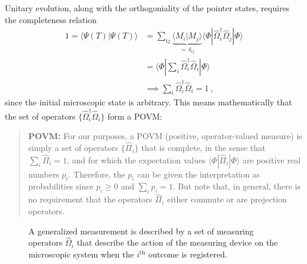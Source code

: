 \documentclass[12pt]{article}
\theoremstyle{plain}
\theoremstyle{definition}
\theoremstyle{remark}
\def\bra#1{\langle #1|}
\def\ket#1{| #1\rangle}
\begin{document}
Unitary evolution, along with the orthogoniality of the pointer states, requires the completeness relation
\begin{align}
1=\bra{\Psi(T)}\Psi(T)\rangle
&=\sum_{ij}\underbrace{\bra{M_i}M_j\rangle}_{=\,\delta_{ij}}\bra{\Phi}\hat \Omega_i^\dagger\hat \Omega_j\ket{\Phi}\\
&=\bra{\Phi}\sum_i\hat \Omega_i^\dagger\hat \Omega_i\ket{\Phi}\\
&\!\!\implies\sum_i\hat\Omega_i^\dagger\hat\Omega_i=1\ ,
\label{com}
\end{align}
since the initial microscopic state is arbitrary.
This means mathematically that the set of operators $\{\hat\Omega_i^\dagger\hat\Omega_i\}$ form a POVM: 
\begin{quote}{\bf POVM:} For our purposes, a POVM (positive, operator-valued measure) is simply a set of operators $\{\hat\Pi_i\}$ that is complete, in the sense that $\sum_i\hat\Pi_i=1$, and for which the expectation values $\bra{\Phi}\hat\Pi_i\ket{\Phi}$ are positive real numbers $p_i$. Therefore, the $p_i$ can be given the interpretation as probabilities since $p_i\geq0$ and $\sum_ip_i=1$. But note that, in general, there is no requirement that the operators $\hat\Pi_i$ either commute or are projection operators.
\end{quote}
\begin{figure}[ht]
\begin{center}
\end{center}
\caption{A generalized measurement is described by a set of measuring operators $\hat\Omega_i$ that describe the action of the measuring device on the microscopic system when the $i^\text{th}$ outcome is registered.}
\label{f2}
\end{figure}
\end{document}
